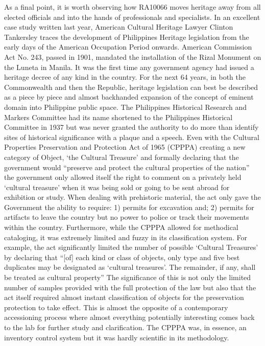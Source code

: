 As a final point, it is worth observing how RA10066 moves heritage away from all elected officials and into the hands of professionals and specialists.  In an excellent case study written last year, American Cultural Heritage Lawyer Clinton Tankersley traces the development of Philippines Heritage legislation from the early days of the American Occupation Period onwards. American Commission Act No. \num{243}, passed in 1901, mandated the installation of the Rizal Monument on the Luneta in Manila. 
It was the first time any government agency had issued a heritage decree of any kind in the country.  For the next \num{64} years, in both the Commonwealth and then the Republic, heritage legislation can best be described as a piece by piece and almost backhanded expansion of the concept of eminent domain into Philippine public space. 
The Philippines Historical Research and Markers Committee had its name shortened to the Philippines Historical Committee in 1937 but was never granted the authority to do more than identify sites of historical significance with a plaque and a speech. Even with the Cultural Properties Preservation and Protection Act of 1965 (CPPPA) 
creating a new category of Object, ‘the Cultural Treasure’ and formally declaring that the government would “preserve and protect the cultural properties of the nation” %
the government only allowed itself the right to comment on a privately held ‘cultural treasure’ when it was being sold or going to be sent abroad for exhibition or study. When dealing with prehistoric material, the act only gave the Government the ability to require: 1) permits for excavation and; 2) permits for artifacts to leave the country but no power to police or track their movements within the country. Furthermore, while the CPPPA allowed for methodical cataloging, it was extremely limited and fuzzy in its classification system. For example, the act significantly limited the number of possible ‘Cultural Treasures’ by declaring that “[of] each kind or class of objects, only type and five best duplicates may be designated as ‘cultural treasures’. The remainder, if any, shall be treated as cultural property” %
The significance of this is not only the limited number of samples provided with the full protection of the law but also that the act itself required almost instant classification of objects for the preservation protection to take effect. This is almost the opposite of a contemporary accessioning process where almost everything potentially interesting comes back to the lab for further study and clarification. The CPPPA was, in essence, an inventory control system but it was hardly scientific in its methodology.

